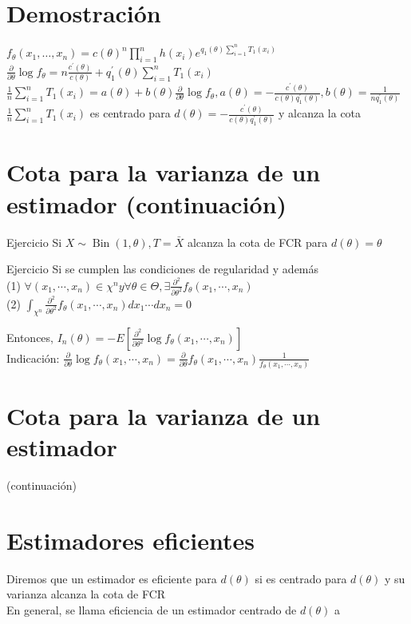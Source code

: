 \section*{Demostración}
$f_{\theta}\left(x_{1}, \ldots, x_{n}\right)=c(\theta)^{n} \prod_{i=1}^{n} h\left(x_{i}\right) e^{q_{1}(\theta) \sum_{i=1}^{n} T_{1}\left(x_{i}\right)}$\\
$\frac{\partial}{\partial \theta} \log f_{\theta}=n \frac{c^{\prime}(\theta)}{c(\theta)}+q_{1}^{\prime}(\theta) \sum_{i=1}^{n} T_{1}\left(x_{i}\right)$\\
$\frac{1}{n} \sum_{i=1}^{n} T_{1}\left(x_{i}\right)=a(\theta)+b(\theta) \frac{\partial}{\partial \theta} \log f_{\theta}, a(\theta)=-\frac{c^{\prime}(\theta)}{c(\theta) q_{1}^{\prime}(\theta)}, b(\theta)=\frac{1}{n q_{1}^{\prime}(\theta)}$\\
$\frac{1}{n} \sum_{i=1}^{n} T_{1}\left(x_{i}\right)$ es centrado para $d(\theta)=-\frac{c^{\prime}(\theta)}{c(\theta) q_{1}^{\prime}(\theta)}$ y alcanza la cota

\section*{Cota para la varianza de un estimador (continuación)}
Ejercicio Si $X \sim \operatorname{Bin}(1, \theta), T=\bar{X}$ alcanza la cota de FCR para $d(\theta)=\theta$

Ejercicio Si se cumplen las condiciones de regularidad y además\\
(1) $\forall\left(x_{1}, \cdots, x_{n}\right) \in \chi^{n} y \forall \theta \in \Theta, \exists \frac{\partial^{2}}{\partial \theta^{2}} f_{\theta}\left(x_{1}, \cdots, x_{n}\right)$\\
(2) $\int_{\chi^{n}} \frac{\partial^{2}}{\partial \theta^{2}} f_{\theta}\left(x_{1}, \cdots, x_{n}\right) d x_{1} \cdots d x_{n}=0$

Entonces, $I_{n}(\theta)=-E\left[\frac{\partial^{2}}{\partial \theta^{2}} \log f_{\theta}\left(x_{1}, \cdots, x_{n}\right)\right]$\\
Indicación: $\frac{\partial}{\partial \theta} \log f_{\theta}\left(x_{1}, \cdots, x_{n}\right)=\frac{\partial}{\partial \theta} f_{\theta}\left(x_{1}, \cdots, x_{n}\right) \frac{1}{f_{\theta}\left(x_{1}, \cdots, x_{n}\right)}$

\section*{Cota para la varianza de un estimador}
 (continuación)\section*{Estimadores eficientes}
Diremos que un estimador es eficiente para $d(\theta)$ si es centrado para $d(\theta)$ y su varianza alcanza la cota de FCR\\
En general, se llama eficiencia de un estimador centrado de $d(\theta)$ a

